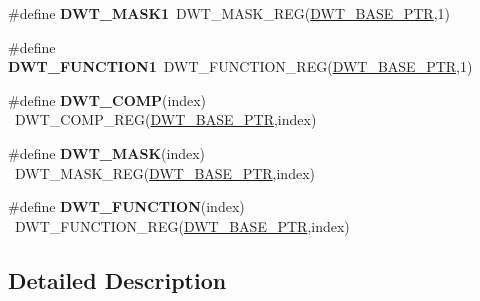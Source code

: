 \begin{DoxyCompactItemize}
\item 
\hypertarget{group___d_w_t___register___accessor___macros_gad658f7a25b44d3be3ceeba8ef070b918}{}\#define {\bfseries D\+W\+T\+\_\+\+M\+A\+S\+K1}~D\+W\+T\+\_\+\+M\+A\+S\+K\+\_\+\+R\+E\+G(\hyperlink{group___d_w_t___peripheral_ga3b46dfb2ea7946c6938028d879c82cb1}{D\+W\+T\+\_\+\+B\+A\+S\+E\+\_\+\+P\+T\+R},1)\label{group___d_w_t___register___accessor___macros_gad658f7a25b44d3be3ceeba8ef070b918}

\item 
\hypertarget{group___d_w_t___register___accessor___macros_ga6e512f90919120ad3ecf145caafef873}{}\#define {\bfseries D\+W\+T\+\_\+\+F\+U\+N\+C\+T\+I\+O\+N1}~D\+W\+T\+\_\+\+F\+U\+N\+C\+T\+I\+O\+N\+\_\+\+R\+E\+G(\hyperlink{group___d_w_t___peripheral_ga3b46dfb2ea7946c6938028d879c82cb1}{D\+W\+T\+\_\+\+B\+A\+S\+E\+\_\+\+P\+T\+R},1)\label{group___d_w_t___register___accessor___macros_ga6e512f90919120ad3ecf145caafef873}

\item 
\hypertarget{group___d_w_t___register___accessor___macros_ga8cd13337dbf7cec23c7f8c3621860e9e}{}\#define {\bfseries D\+W\+T\+\_\+\+C\+O\+M\+P}(index)                                                ~D\+W\+T\+\_\+\+C\+O\+M\+P\+\_\+\+R\+E\+G(\hyperlink{group___d_w_t___peripheral_ga3b46dfb2ea7946c6938028d879c82cb1}{D\+W\+T\+\_\+\+B\+A\+S\+E\+\_\+\+P\+T\+R},index)\label{group___d_w_t___register___accessor___macros_ga8cd13337dbf7cec23c7f8c3621860e9e}

\item 
\hypertarget{group___d_w_t___register___accessor___macros_ga293560983db73f0a6acead2a597fe349}{}\#define {\bfseries D\+W\+T\+\_\+\+M\+A\+S\+K}(index)                                                ~D\+W\+T\+\_\+\+M\+A\+S\+K\+\_\+\+R\+E\+G(\hyperlink{group___d_w_t___peripheral_ga3b46dfb2ea7946c6938028d879c82cb1}{D\+W\+T\+\_\+\+B\+A\+S\+E\+\_\+\+P\+T\+R},index)\label{group___d_w_t___register___accessor___macros_ga293560983db73f0a6acead2a597fe349}

\item 
\hypertarget{group___d_w_t___register___accessor___macros_ga6fc901c7f1391678b4058358fd39b877}{}\#define {\bfseries D\+W\+T\+\_\+\+F\+U\+N\+C\+T\+I\+O\+N}(index)                                        ~D\+W\+T\+\_\+\+F\+U\+N\+C\+T\+I\+O\+N\+\_\+\+R\+E\+G(\hyperlink{group___d_w_t___peripheral_ga3b46dfb2ea7946c6938028d879c82cb1}{D\+W\+T\+\_\+\+B\+A\+S\+E\+\_\+\+P\+T\+R},index)\label{group___d_w_t___register___accessor___macros_ga6fc901c7f1391678b4058358fd39b877}

\end{DoxyCompactItemize}


\subsection{Detailed Description}
